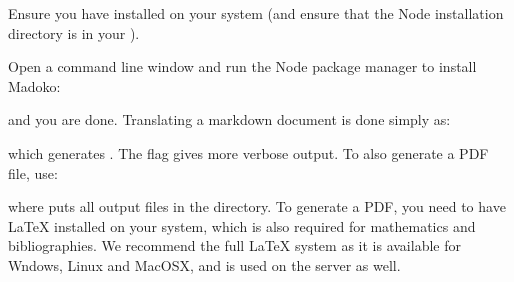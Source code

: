 \documentclass{book}
\begin{document}
\begin{mdUl}[class={list-star,compact},data-line={208}]%
\begin{mdLi}[data-line={208}]%
{}Ensure you have%
{}{\mdNbsp}%
{} installed on your system (and ensure that the
  Node installation directory is in your %
{}%
{}).%
\end{mdLi}%
\begin{mdLi}[data-line={210}]%
{}Open a command line window and run the Node package manager to install Madoko:%
{}\mdBr
{}%
{}%
\end{mdLi}%
\end{mdUl}%
\begin{mdP}[class={para-continue},data-line={213}]%
{}and you are done. Translating a markdown document is done simply as:%
\end{mdP}%
\begin{mdUl}[class={list-star,compact},data-line={215}]%
\begin{mdLi}[data-line={215}]%
{}%
{}%
\end{mdLi}%
\end{mdUl}%
\begin{mdP}[class={para-continue},data-line={217}]%
{}which generates %
{}%
{}. The %
{}%
{} flag gives more verbose output.
To also generate a PDF file, use:%
\end{mdP}%
\begin{mdUl}[class={list-star,compact},data-line={220}]%
\begin{mdLi}[data-line={220}]%
{}%
{}%
\end{mdLi}%
\end{mdUl}%
\begin{mdP}[data-line={222}]%
{}where %
{}%
{} puts all output files in the %
{}%
{} directory.
To generate a PDF, you need to have LaTeX installed on your system,
which is also required for mathematics and bibliographies.
We recommend the full%
{}{\mdNbsp}%
{} LaTeX system as it is available for
Wndows, Linux and MacOSX, and is used on the%
{}{\mdNbsp}%
{} server as well.%
\end{mdP}%
\end{document}
